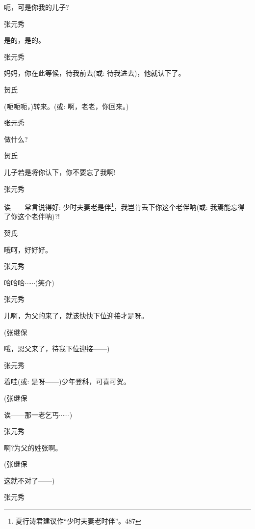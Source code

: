 呃，可是你我的儿子?

张元秀\hspace{20pt}~

是的，是的。

张元秀\hspace{20pt}~

妈妈，你在此等候，待我前去({\akai 或}: 待我进去)，他就认下了。

贺氏\hspace{30pt}~

(呃呃呃，)转来。({\akai 或}: 啊，老老，你回来。)

张元秀\hspace{20pt}~

做什么?

贺氏\hspace{30pt}~

儿子若是将你认下，你不要忘了我啊!

张元秀

诶------常言说得好: 少时夫妻老是伴\footnote{ 夏行涛君建议作``少时夫妻老时伴''。{487}}，我岂肯丢下你这个老伴呐({\akai 或}: 我焉能忘得了你这个老伴呐)?!

贺氏\hspace{30pt}~

哦呵，好好好。

张元秀\hspace{20pt}~

哈哈哈$\cdots{}\cdots{}$(笑介)

张元秀\hspace{20pt}~

儿啊，为父的来了，就该快快下位迎接才是呀。

(张继保\hspace{20pt}~

哦，恩父来了，待我下位迎接------)

张元秀\hspace{20pt}~

着哇({\akai 或}: 是呀------)少年登科，可喜可贺。

(张继保\hspace{20pt}~

诶------那一老乞丐$\cdots{}\cdots{}$)

张元秀\hspace{20pt}~

啊?为父的姓张啊。

(张继保\hspace{20pt}~

这就不对了------)

张元秀\hspace{20pt}~


